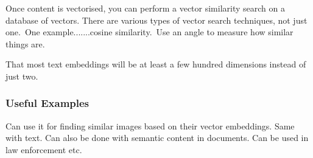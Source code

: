 Once content is vectorised, you can perform a vector similarity search on a database of vectors.
There are various types of vector search techniques, not just one.\ One example.......cosine similarity.\ Use an angle to measure how similar things are.

\begin{note}
    That most text embeddings will be at least a few hundred dimensions instead of just two.
\end{note}

\subsubsection{Useful Examples}
Can use it for finding similar images based on their vector embeddings.
Same with text.
Can also be done with semantic content in documents.
Can be used in law enforcement etc.
